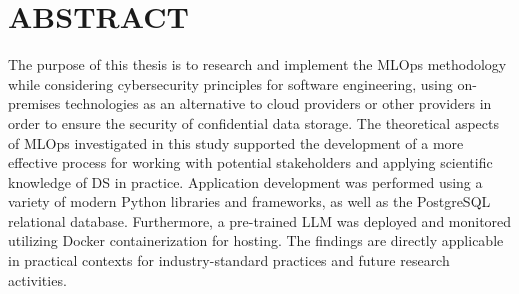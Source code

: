 

\chapter*[Abstract]{ABSTRACT}
The purpose of this thesis is to research and implement the MLOps methodology while considering cybersecurity principles for software engineering, using on-premises technologies as an alternative to cloud providers or other providers in order to ensure the security of confidential data storage. The theoretical aspects of MLOps investigated in this study supported the development of a more effective process for working with potential stakeholders and applying scientific knowledge of DS in practice. Application development was performed using a variety of modern Python libraries and frameworks, as well as the PostgreSQL relational database. Furthermore, a pre-trained LLM was deployed and monitored utilizing Docker containerization for hosting. The findings are directly applicable in practical contexts for industry-standard practices and future research activities.


